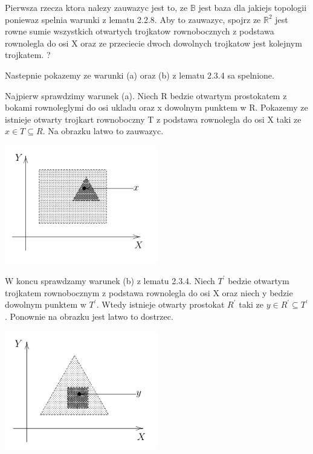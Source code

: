 \documentclass{article}
\begin{document}
Pierwsza rzecza ktora nalezy zauwazyc jest to, ze $\mathbb{B}$ jest baza dla jakiejs topologii poniewaz spelnia warunki z lematu 2.2.8. Aby to zauwazyc, spojrz ze $\mathbb{R}^{2}$ jest rowne sumie wszystkich otwartych trojkatow rownobocznych z podstawa rownolegla do osi X oraz ze przeciecie dwoch dowolnych trojkatow jest kolejnym trojkatem. ?

Nastepnie pokazemy ze warunki (a) oraz (b) z lematu 2.3.4 sa spelnione.

Najpierw sprawdzimy warunek (a). Niech R bedzie otwartym prostokatem z bokami rownoleglymi do osi ukladu oraz x dowolnym punktem w R. Pokazemy ze istnieje otwarty trojkart rownoboczny T z podstawa rownolegla do osi X taki ze $x \in T \subseteq R$. Na obrazku latwo to zauwazyc.

\begin{center}
    \begin{minipage}[h]{0.8\textwidth}
        \centering
        \includegraphics[width=0.5\textwidth]{trojkat2.png}
    \end{minipage}
\end{center}

W koncu sprawdzamy warunek (b) z lematu 2.3.4. Niech $T^{\prime}$ bedzie otwartym trojkatem rownobocznym z podstawa rownolegla do osi X oraz niech y bedzie dowolnym punktem w $T^{\prime}$. Wtedy istnieje otwarty prostokat $R^{\prime}$ taki ze $y \in R^{\prime} \subseteq T^{\prime}$. Ponownie na obrazku jest latwo to dostrzec.

\begin{center}
    \begin{minipage}[h]{0.8\textwidth}
        \centering
        \includegraphics[width=0.5\textwidth]{trojkat3.png}
    \end{minipage}
\end{center}
\end{document}
